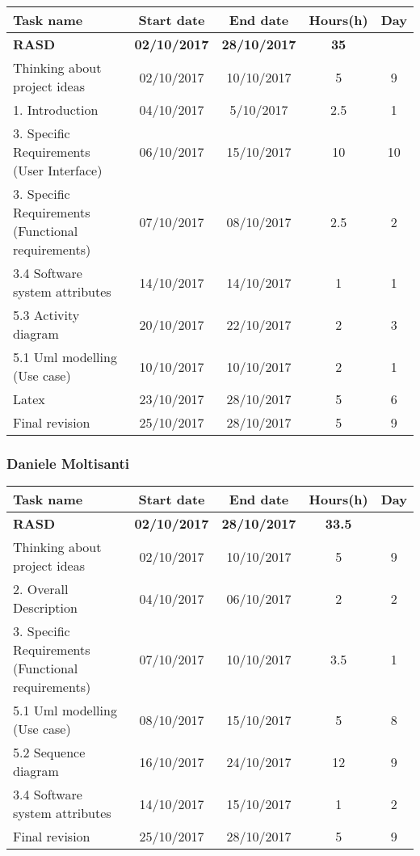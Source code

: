 \begin{table}[h!]
	\begin{tabular}{lcccc}
		\toprule
		\textbf{Task name} & \textbf{Start date} & \textbf{End date} & \textbf{Hours(h)} & \textbf{Day} \\
		\midrule
		\textbf{RASD} & \textbf{02/10/2017} & \textbf{28/10/2017} & \textbf{35} &  \\
		Thinking about project ideas & 02/10/2017 & 10/10/2017 & 5 & 9 \\
		1. Introduction & 04/10/2017 & 5/10/2017 & 2.5 & 1 \\
		3. Specific Requirements (User Interface) & 06/10/2017 & 15/10/2017 & 10 & 10 \\
		3. Specific Requirements (Functional requirements) & 07/10/2017 & 08/10/2017 & 2.5 & 2 \\
		3.4 Software system attributes & 14/10/2017 & 14/10/2017 & 1 & 1 \\
		5.3 Activity diagram & 20/10/2017 & 22/10/2017 & 2 & 3 \\
		5.1 Uml modelling (Use case) & 10/10/2017 & 10/10/2017 & 2 & 1 \\
		Latex & 23/10/2017 & 28/10/2017 & 5 & 6 \\
		\bottomrule
		Final revision & 25/10/2017 & 28/10/2017 & 5 & 9 \\
	\end{tabular}
\end{table}

\subsubsection{Daniele Moltisanti}
\begin{table}[h!]
	\begin{tabular}{lcccc}
		\toprule
		\textbf{Task name} & \textbf{Start date} & \textbf{End date} & \textbf{Hours(h)} & \textbf{Day} \\
		\midrule
		\textbf{RASD} & \textbf{02/10/2017} & \textbf{28/10/2017} & \textbf{33.5} & \\
		Thinking about project ideas & 02/10/2017 & 10/10/2017 & 5 & 9 \\
		2. Overall Description & 04/10/2017 & 06/10/2017 & 2 & 2 \\
		3. Specific Requirements (Functional requirements) & 07/10/2017 & 10/10/2017 & 3.5 & 1 \\
		5.1 Uml modelling (Use case) & 08/10/2017 & 15/10/2017 & 5 & 8 \\
		5.2 Sequence diagram & 16/10/2017 & 24/10/2017 & 12 & 9 \\
		3.4 Software system attributes & 14/10/2017 & 15/10/2017 & 1 & 2 \\
		\bottomrule
		Final revision & 25/10/2017 & 28/10/2017 & 5 & 9 \\
	\end{tabular}
\end{table}